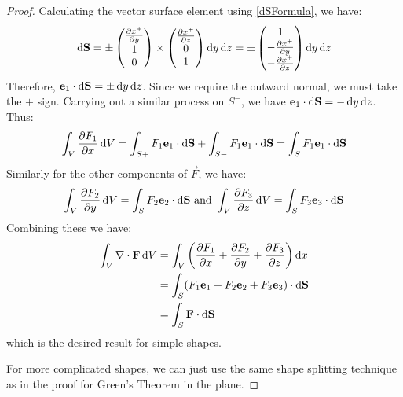 \documentclass[../main.tex]{subfiles}
\begin{document}
\begin{proof}
  Calculating the vector surface element using \cref{dSFormula}, we have:
  \[
    \d{\vec{S}} = \pm \begin{pmatrix}
    \pderiv{x^{+}}{y} \\
    1 \\
    0 \\
    \end{pmatrix} \times \begin{pmatrix}
    \pderiv{x^{+}}{z} \\
    0 \\
    1 \\
    \end{pmatrix} \d{y}\d{z} = \pm \begin{pmatrix}
    1 \\
    -\pderiv{x^{+}}{y} \\
    -\pderiv{x^{+}}{z} \\
    \end{pmatrix} \d{y}\d{z}
  \]
  Therefore, $\vec{e}_1 \cdot \d{\vec{S}} = \pm \d{y} \d{z}$.
  Since we require the outward normal, we must take the $+$ sign.
  Carrying out a similar process on $S^{-}$, we have $\vec{e}_1 \cdot \d{\vec{S}} = - \d{y}\d{z}$.
  Thus:
  \[
    \int_{V} \pderiv{F_1}{x} \d{V} = \int_{S+} F_1 \vec{e}_1 \cdot \d{\vec{S}} + \int_{S-} F_1 \vec{e}_1 \cdot \d{\vec{S}} = \int_{S} F_1 \vec{e}_1 \cdot \d{\vec{S}}
  \]
  Similarly for the other components of $\vec{F}$, we have:
  \[
    \int_{V} \pderiv{F_2}{y} \d{V} = \int_{S} F_2 \vec{e}_2 \cdot \d{\vec{S}} \text{ and } \int_{V} \pderiv{F_3}{z} \d{V} = \int_{S} F_3 \vec{e}_3 \cdot \d{\vec{S}}
  \]
  Combining these we have:
  \begin{align*}
    \int_{V} \nabla \cdot \vec{F} \d{V} &= \int_{V} \left(\pderiv{F_1}{x} + \pderiv{F_2}{y} + \pderiv{F_3}{z}\right) \d{x} \\
                                        &= \int_{S} (F_1 \vec{e}_1 + F_2 \vec{e}_2 + F_3 \vec{e}_3) \cdot \d{\vec{S}} \\
                                        &=\int_{S} \vec{F} \cdot \d{\vec{S}}
  \end{align*}
  which is the desired result for simple shapes.

  For more complicated shapes, we can just use the same shape splitting technique as in the proof for Green's Theorem in the plane.
\end{proof}
\end{document}
